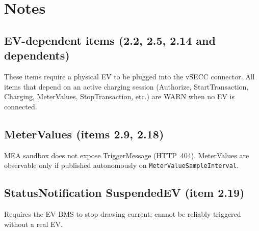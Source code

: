 \documentclass[10pt, a4paper]{article}
\begin{document}
\section{Notes}

\subsection*{EV-dependent items (2.2, 2.5, 2.14 and dependents)}
These items require a physical EV to be plugged into the vSECC connector.
All items that depend on an active charging session (Authorize, StartTransaction,
Charging, MeterValues, StopTransaction, etc.) are WARN when no EV is connected.

\subsection*{MeterValues (items 2.9, 2.18)}
MEA sandbox does not expose TriggerMessage (HTTP~404).
MeterValues are observable only if published autonomously on \texttt{MeterValueSampleInterval}.

\subsection*{StatusNotification SuspendedEV (item 2.19)}
Requires the EV BMS to stop drawing current; cannot be reliably triggered without a real EV.
\end{document}
